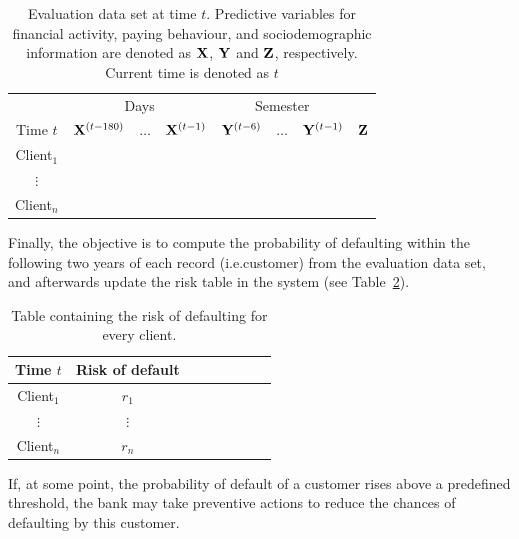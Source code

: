\begin{itemize}
\begin{table}[htbp]
\centering
\begin{tabular}{c|ccc|ccc|c}
	&\multicolumn{3}{c|}{Days} & \multicolumn{3}{c|}{Semester} \\
     Time $t$              & $\mathbf{X}^{(t-180)}$ & $\ldots$ & $\mathbf{X}^{(t-1)} $ & $\mathbf{Y}^{(t-6)}$  & $\ldots$ & $\mathbf{Y}^{(t-1)} $ & $\mathbf{Z}$  \\  
\hline
Client$_1$  &                                                  &              &                     &                               &                     &        \\ 
$\vdots$      &                                                 &               &                     &                                &                     &      \\ 
Client$_n$  &                                                &               &                     &                                &                     &     \\ 
\end{tabular}
\caption{Evaluation data set at time $t$. Predictive variables for financial activity, paying behaviour, and sociodemographic information are denoted as $\mathbf{X}$, $\mathbf{Y}$ and $\mathbf{Z}$, respectively. Current time is denoted as $t$}
\label{tab:EvaluationDataset} 
\end{table}

Finally, the objective is to compute the probability of defaulting within the following two years of each record (i.e.customer) from the evaluation data set, and afterwards update the risk table in the system (see Table~\ref{tab:riskTable}).

\begin{table}[h]
\centering
\begin{tabular}{c|ccc|ccc|c}
     Time $t$  & Risk of default \\  
\hline
Client$_1$  &    $r_1$  \\ 
$\vdots$      &   $\vdots$   \\ 
Client$_n$  &   $r_n$  \\ 
\end{tabular} 
\caption{Table containing the risk of defaulting for every client.}
\label{tab:riskTable}
\end{table}

If, at some point, the probability of default of a customer rises above a predefined threshold, the bank may take preventive actions to reduce the chances of defaulting by this customer.



\end{itemize}
